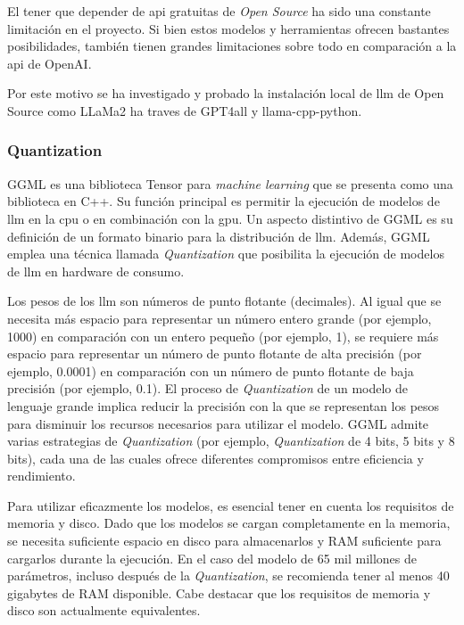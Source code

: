 El tener que depender de \acrshort{api} gratuitas de \textit{Open Source} ha sido una constante limitación en el proyecto. Si bien estos modelos y herramientas ofrecen bastantes posibilidades, también tienen grandes limitaciones sobre todo en comparación a la \acrshort{api} de OpenAI.

Por este motivo se ha investigado y probado la instalación local de \acrshort{llm} de Open Source como LLaMa2 ha traves de GPT4all y llama-cpp-python.

\subsubsection{Quantization}

GGML es una biblioteca Tensor para \textit{machine learning} que se presenta como una biblioteca en C++. Su función principal es permitir la ejecución de modelos de \acrlong{llm} en la \acrshort{cpu} o en combinación con la \acrshort{gpu}. Un aspecto distintivo de GGML es su definición de un formato binario para la distribución de \acrshort{llm}. Además, GGML emplea una técnica llamada \textit{Quantization} que posibilita la ejecución de modelos de \acrshort{llm} en hardware de consumo\cite{GGML_Gimmi}.

Los pesos de los \acrshort{llm} son números de punto flotante (decimales). Al igual que se necesita más espacio para representar un número entero grande (por ejemplo, 1000) en comparación con un entero pequeño (por ejemplo, 1), se requiere más espacio para representar un número de punto flotante de alta precisión (por ejemplo, 0.0001) en comparación con un número de punto flotante de baja precisión (por ejemplo, 0.1). El proceso de \textit{Quantization} de un modelo de lenguaje grande implica reducir la precisión con la que se representan los pesos para disminuir los recursos necesarios para utilizar el modelo. GGML admite varias estrategias de \textit{Quantization} (por ejemplo, \textit{Quantization} de 4 bits, 5 bits y 8 bits), cada una de las cuales ofrece diferentes compromisos entre eficiencia y rendimiento.

Para utilizar eficazmente los modelos, es esencial tener en cuenta los requisitos de memoria y disco. Dado que los modelos se cargan completamente en la memoria, se necesita suficiente espacio en disco para almacenarlos y RAM suficiente para cargarlos durante la ejecución. En el caso del modelo de 65 mil millones de parámetros, incluso después de la \textit{Quantization}, se recomienda tener al menos 40 gigabytes de RAM disponible. Cabe destacar que los requisitos de memoria y disco son actualmente equivalentes.

